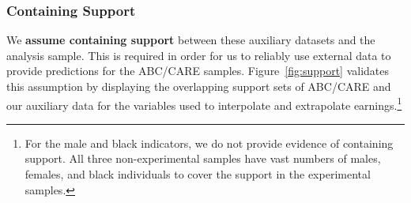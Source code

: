 \subsubsection{Containing Support}

\noindent We \textbf{assume containing support} between these auxiliary datasets and the analysis sample. This is required in order for us to reliably use external data to provide predictions for the ABC/CARE samples. Figure~\ref{fig:support} validates this assumption by displaying the overlapping support sets of ABC/CARE and our auxiliary data for the variables used to interpolate and extrapolate earnings.\footnote{For the male and black indicators, we do not provide evidence of containing support. All three non-experimental samples have vast numbers of males, females, and black individuals to cover the support in the experimental samples.}\\

